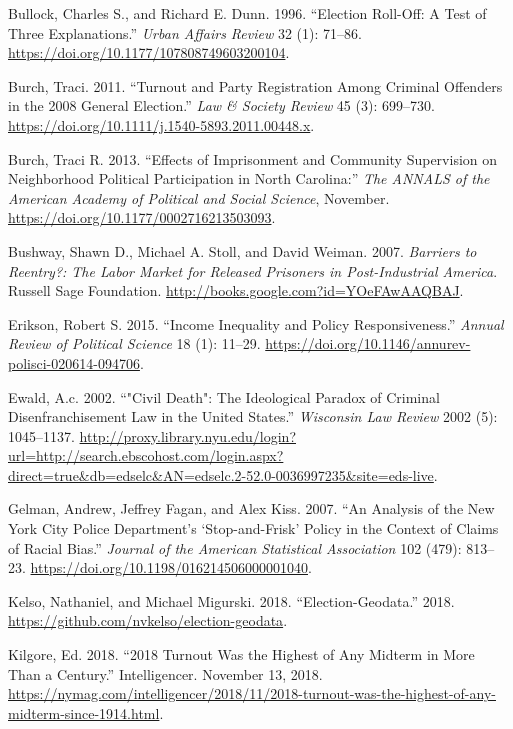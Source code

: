 \documentclass[
  12pt,
]{article}
\newlength{\cslhangindent}
\newenvironment{cslreferences}%
  {\setlength{\parindent}{0pt}%
  \everypar{\setlength{\hangindent}{\cslhangindent}}\ignorespaces}%
  {\par}
\begin{document}
\begin{cslreferences}
\leavevmode\hypertarget{ref-Bullock1996}{}%
Bullock, Charles S., and Richard E. Dunn. 1996. ``Election Roll-Off: A Test of Three Explanations.'' \emph{Urban Affairs Review} 32 (1): 71--86. \url{https://doi.org/10.1177/107808749603200104}.

\leavevmode\hypertarget{ref-Burch2011}{}%
Burch, Traci. 2011. ``Turnout and Party Registration Among Criminal Offenders in the 2008 General Election.'' \emph{Law \& Society Review} 45 (3): 699--730. \url{https://doi.org/10.1111/j.1540-5893.2011.00448.x}.

\leavevmode\hypertarget{ref-Burch2013}{}%
Burch, Traci R. 2013. ``Effects of Imprisonment and Community Supervision on Neighborhood Political Participation in North Carolina:'' \emph{The ANNALS of the American Academy of Political and Social Science}, November. \url{https://doi.org/10.1177/0002716213503093}.

\leavevmode\hypertarget{ref-Bushway2007}{}%
Bushway, Shawn D., Michael A. Stoll, and David Weiman. 2007. \emph{Barriers to Reentry?: The Labor Market for Released Prisoners in Post-Industrial America}. Russell Sage Foundation. \url{http://books.google.com?id=YOeFAwAAQBAJ}.

\leavevmode\hypertarget{ref-Erikson2015}{}%
Erikson, Robert S. 2015. ``Income Inequality and Policy Responsiveness.'' \emph{Annual Review of Political Science} 18 (1): 11--29. \url{https://doi.org/10.1146/annurev-polisci-020614-094706}.

\leavevmode\hypertarget{ref-Ewald2002}{}%
Ewald, A.c. 2002. ``"Civil Death": The Ideological Paradox of Criminal Disenfranchisement Law in the United States.'' \emph{Wisconsin Law Review} 2002 (5): 1045--1137. \url{http://proxy.library.nyu.edu/login?url=http://search.ebscohost.com/login.aspx?direct=true\&db=edselc\&AN=edselc.2-52.0-0036997235\&site=eds-live}.

\leavevmode\hypertarget{ref-Gelman2007}{}%
Gelman, Andrew, Jeffrey Fagan, and Alex Kiss. 2007. ``An Analysis of the New York City Police Department's `Stop-and-Frisk' Policy in the Context of Claims of Racial Bias.'' \emph{Journal of the American Statistical Association} 102 (479): 813--23. \url{https://doi.org/10.1198/016214506000001040}.

\leavevmode\hypertarget{ref-Kelso2018}{}%
Kelso, Nathaniel, and Michael Migurski. 2018. ``Election-Geodata.'' 2018. \url{https://github.com/nvkelso/election-geodata}.

\leavevmode\hypertarget{ref-Kilgore2018}{}%
Kilgore, Ed. 2018. ``2018 Turnout Was the Highest of Any Midterm in More Than a Century.'' Intelligencer. November 13, 2018. \url{https://nymag.com/intelligencer/2018/11/2018-turnout-was-the-highest-of-any-midterm-since-1914.html}.


\end{cslreferences}
\end{document}
